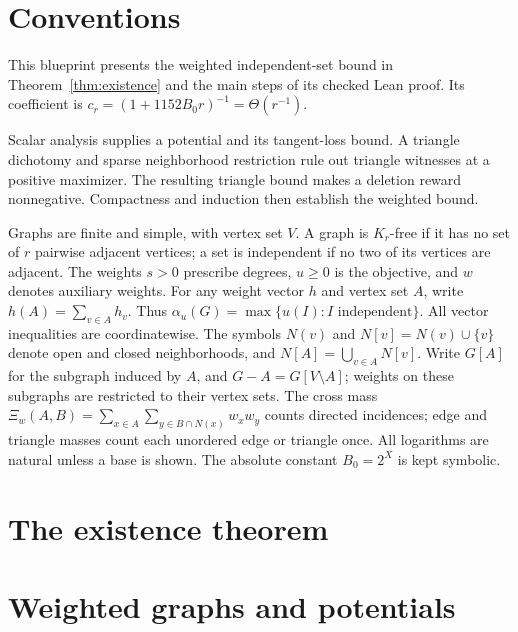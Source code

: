 

\tableofcontents

\chapter{Conventions}

This blueprint presents the weighted independent-set bound in
Theorem~\ref{thm:existence} and the main steps of its checked Lean proof.
Its coefficient is
$c_r=(1+1152B_0r)^{-1}=\Theta(r^{-1})$.

Scalar analysis supplies a potential and its tangent-loss bound. A triangle
dichotomy and sparse neighborhood restriction rule out triangle witnesses at
a positive maximizer. The resulting triangle bound makes a deletion reward
nonnegative. Compactness and induction then establish the weighted bound.

Graphs are finite and simple, with vertex set $V$. A graph is $K_r$-free if
it has no set of $r$ pairwise adjacent vertices; a set is independent if
no two of its vertices are adjacent. The weights $s>0$ prescribe degrees,
$u\ge0$ is the objective, and $w$ denotes auxiliary weights. For any weight
vector $h$ and vertex set $A$, write $h(A)=\sum_{v\in A}h_v$. Thus
$\alpha_u(G)=\max\{u(I):I\text{ independent}\}$.
All vector inequalities are coordinatewise. The symbols $N(v)$ and
$N[v]=N(v)\cup\{v\}$ denote open and closed neighborhoods, and
$N[A]=\bigcup_{v\in A}N[v]$. Write $G[A]$ for the subgraph induced by $A$,
and $G-A=G[V\setminus A]$; weights on these subgraphs are restricted to
their vertex sets. The cross mass
$\Xi_w(A,B)=\sum_{x\in A}\sum_{y\in B\cap N(x)}w_xw_y$ counts directed
incidences; edge and triangle masses count each unordered edge or triangle once.
All logarithms are natural unless a base is shown. The absolute constant
$B_0=2^X$ is kept symbolic.

\chapter{The existence theorem}


\chapter{Weighted graphs and potentials}

